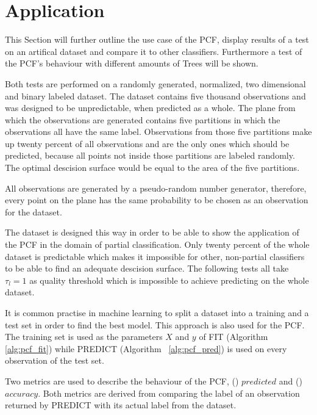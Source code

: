\section{Application}
\label{sec:application}

This Section will further outline the use case of the PCF,
display results of a test on an artifical dataset and
compare it to other classifiers. Furthermore a test of the
PCF's behaviour with different amounts of Trees will be
shown.

Both tests are performed on a randomly generated,
normalized, two dimensional and binary labeled dataset. The
dataset contains five thousand observations and was
designed to be unpredictable, when predicted as a whole.
The plane from which the observations are generated
contains five partitions in which the observations all have
the same label. Observations from those five partitions
make up twenty percent of all observations and are the only
ones which should be predicted, because all points not
inside those partitions are labeled randomly. The optimal
descision surface would be equal to the area of the five
partitions.

All observations are generated by a pseudo-random number
generator\cite[chapter 9.6]{python}, therefore, every point
on the plane has the same probability to be chosen as an
observation for the dataset.

The dataset is designed this way in order to be able to
show the application of the PCF in the domain of partial
classification. Only twenty percent of the whole dataset is
predictable which makes it impossible for other,
non-partial classifiers to be able to find an adequate
descision surface. The following tests all take
$\tau_l = 1$ as quality threshold which is impossible to
achieve predicting on the whole dataset.

It is common practise in machine learning to split a
dataset into a training and a test set in order to find
the best model.\cite[chapter 18]{ki}
This approach is also used for the PCF. The training set is
used as the parameters $X$ and $y$ of FIT (Algorithm~%
\ref{alg:pcf_fit}) while PREDICT (Algorithm~%
\ref{alg:pcf_pred}) is used on every observation of the
test set.

Two metrics are used to describe the behaviour of the PCF,
() $predicted$ and ()
$accuracy$. Both metrics are derived from comparing the
label of an observation returned by PREDICT with its actual
label from the dataset.

